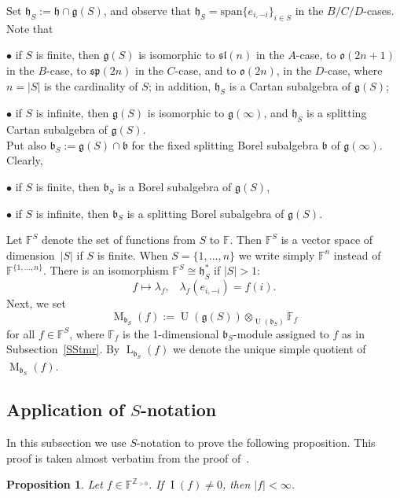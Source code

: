 \documentclass{emsprocart}
\newtheorem{proposition}[theorem]{Proposition}
\newcommand{\PenkovPetukhovBr}[1]{\mathrm{span}\{#1\}}
\begin{document}
Set $\mathfrak h_S:=\mathfrak h\cap\mathfrak g(S)$, and observe that $\mathfrak h_S=\PenkovPetukhovBr{e_{i,-i}}_{i\in S}$ in the $B/C/D$-cases. Note that

$\bullet$ if $S$ is finite, then $\mathfrak g(S)$ is isomorphic to $\mathfrak{sl}(n)$ in the $A$-case, to $\mathfrak o(2n+1)$ in the $B$-case, to $\mathfrak{sp}(2n)$ in the $C$-case, and to $\mathfrak o(2n)$, in the $D$-case, where $n=|S|$ is the cardinality of $S$; in addition, $\mathfrak h_S$ is a Cartan subalgebra of $\mathfrak g(S)$;

$\bullet$ if $S$ is infinite, then $\mathfrak g(S)$ is isomorphic to $\mathfrak g(\infty)$, and $\mathfrak h_S$  is a splitting Cartan subalgebra of $\mathfrak g(S)$.\\
Put also $\mathfrak b_S:=\mathfrak g(S)\cap\mathfrak b$ for the fixed splitting Borel subalgebra $\mathfrak b$ of $\mathfrak g(\infty)$. Clearly,

$\bullet$ if $S$ is finite, then $\mathfrak b_S$ is a Borel subalgebra of $\mathfrak g(S)$,

$\bullet$ if $S$ is infinite, then $\mathfrak b_S$ is a splitting Borel subalgebra of $\mathfrak g(S)$.

Let $\mathbb F^S$ denote the set of functions from $S$ to $\mathbb F$. Then $\mathbb F^S$ is a vector space of
dimension~$|S|$ if $S$ is finite. When $S=\{1,..., n\}$ we write simply $\mathbb F^n$ instead of $\mathbb F^{\{1,..., n\}}$. There is an isomorphism $\mathbb F^S\cong
\mathfrak h_S^*$ if $|S|>1$:\begin{equation}f\mapsto \lambda_f,\hspace{10pt}
\lambda_f(e_{i, -i})=f(i).\end{equation}
Next, we set $$\operatorname{M}_{\mathfrak b_S}(f):=\operatorname{U}(\mathfrak g(S))\otimes_{\operatorname{U}(\mathfrak b_S)}\mathbb F_{f}$$ for all $f\in\mathbb F^S$, where $\mathbb F_f$ is the 1-dimensional $\mathfrak b_S$-module assigned to $f$ as in Subsection~\ref{SStmr}. By $\operatorname{L}_{\mathfrak b_S}(f)$  we denote the unique simple quotient of $\operatorname{M}_{\mathfrak b_S}(f)$.

\subsection{Application of $S$-notation}\label{SSap} In this subsection we use $S$-notation to prove the following proposition. This proof is taken almost verbatim from the proof of~\cite[Proposition 4.1]{PP2}.
\begin{proposition}\label{Papp}Let $f\in\mathbb F^{\mathbb Z_{>0}}$. If $\operatorname{I}(f)\ne0$, then $|f|<\infty$.\end{proposition}
\end{document}
